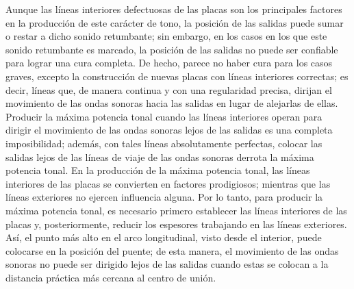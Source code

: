\documentclass[12pt]{book}
\begin{document}
Aunque las líneas interiores defectuosas de las placas son los principales factores en la producción de este carácter de tono, la posición de las salidas puede sumar o restar a dicho sonido retumbante; sin embargo, en los casos en los que este sonido retumbante es marcado, la posición de las salidas no puede ser confiable para lograr una cura completa. De hecho, parece no haber cura para los casos graves, excepto la construcción de nuevas placas con líneas interiores correctas; es decir, líneas que, de manera continua y con una regularidad precisa, dirijan el movimiento de las ondas sonoras hacia las salidas en lugar de alejarlas de ellas. Producir la máxima potencia tonal cuando las líneas interiores operan para dirigir el movimiento de las ondas sonoras lejos de las salidas es una completa imposibilidad; además, con tales líneas absolutamente perfectas, colocar las salidas lejos de las líneas de viaje de las ondas sonoras derrota la máxima potencia tonal. En la producción de la máxima potencia tonal, las líneas interiores de las placas se convierten en factores prodigiosos; mientras que las líneas exteriores no ejercen influencia alguna. Por lo tanto, para producir la máxima potencia tonal, es necesario primero establecer las líneas interiores de las placas y, posteriormente, reducir los espesores trabajando en las líneas exteriores. Así, el punto más alto en el arco longitudinal, visto desde el interior, puede colocarse en la posición del puente; de esta manera, el movimiento de las ondas sonoras no puede ser dirigido lejos de las salidas cuando estas se colocan a la distancia práctica más cercana al centro de unión.
\end{document}
